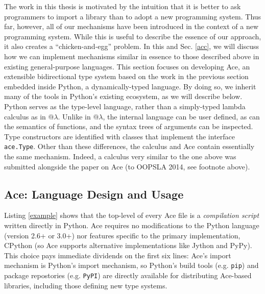 The work in this thesis is motivated by the intuition that it is better to ask programmers to import a library than to adopt a new programming system. Thus far, however, all of our mechanisms have been introduced in the context of a new programming system. While this is useful to describe the essence of our approach, it also creates a ``chicken-and-egg'' problem. In this and Sec. \ref{acc}, we will discuss how we can implement mechanisms similar in essence to those described above in existing general-purpose languages. This section focuses on developing Ace, an extensible bidirectional type system based on the work in the previous section embedded inside Python, a dynamically-typed language. By doing so, we inherit many of the tools in Python's existing ecosystem, as we will describe below. Python serves as the type-level language, rather than a simply-typed lambda calculus as in @$\lambda$. Unlike in @$\lambda$, the internal language can be user defined, as can the semantics of functions, and the syntax trees of arguments can be inspected. Type constructors are identified with classes that implement the interface \verb|ace.Type|. Other than these differences, the calculus and Ace contain essentially the same mechanism. Indeed, a calculus very similar to the one above was submitted alongside the paper on Ace (to OOPSLA 2014, see footnote above).

\subsection{Ace: Language Design and Usage}\label{usage}


%
Listing \ref{example} shows that the top-level of every Ace file is a \emph{compilation script} written directly in Python. Ace requires no modifications to the Python language (version 2.6+ or 3.0+) nor features specific to the primary implementation, CPython (so Ace supports alternative implementations like Jython and PyPy). This choice pays immediate dividends on the first six lines: Ace's import mechanism is Python's import mechanism, so Python's build tools (e.g. \verb|pip|) and package repostories (e.g. \verb|PyPI|) are directly available for distributing Ace-based libraries, including those defining new type systems. %

